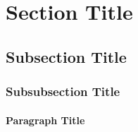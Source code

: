 
\section{Section Title}
\label{sec:section_n2}

\subsection{Subsection Title}

\subsubsection{Subsubsection Title}

\paragraph{Paragraph Title}

\lipsum[1-2]